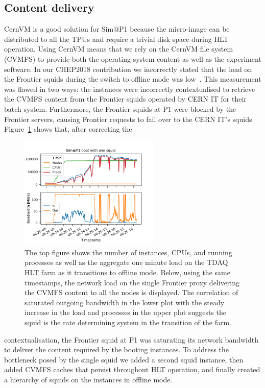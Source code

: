 \documentclass{webofc}
\begin{document}
\subsection{Content delivery}
CernVM is a good solution for Sim@P1 because the micro-image can be distributed
to all the TPUs and require a trivial disk space during HLT operation. Using
CernVM means that we rely on the CernVM file system (CVMFS) to provide both the
operating system content as well as the experiment software. In our CHEP2018
contribution we incorrectly stated that the load on the Frontier
squids during the switch to offline mode was
low~\cite{Berghaus:2019wuj, Dykstra:2019}.
This measurement was flawed in two ways: the instances were incorrectly
contextualised to retrieve the CVMFS content from the Frontier squids operated
by CERN IT for their batch system. Furthermore, the Frontier squids at P1 were
blocked by the Frontier servers, causing Frontier requests to fail over to the
CERN IT's squids Figure~\ref{fig:single_proxy} shows that, after correcting the
\begin{figure}[h]
\centering
\sidecaption
\includegraphics[width=0.6\textwidth,clip]{single_squid}
\caption{The top figure shows the number of instances, CPUs, and running
processes as well as the aggregate one minute load on the TDAQ HLT farm as it
transitions to offline mode. Below, using the same timestamps, the network load
on the single Frontier proxy delivering the CVMFS content to all the nodes is
displayed. The correlation of saturated outgoing bandwidth in the lower plot
with
the steady increase in the load and processes in the upper plot suggests the
squid is the rate determining system in the transition of the farm.}
\label{fig:single_proxy}
\end{figure}
contextualisation, the Frontier squid at P1 was saturating its network bandwidth
to deliver the content required by the booting instances. To address the
bottleneck posed by the single squid we added a second squid instance,
then added CVMFS caches that persist throughout HLT operation, and finally
created
a hierarchy of squids on the instances in offline mode.
\end{document}
